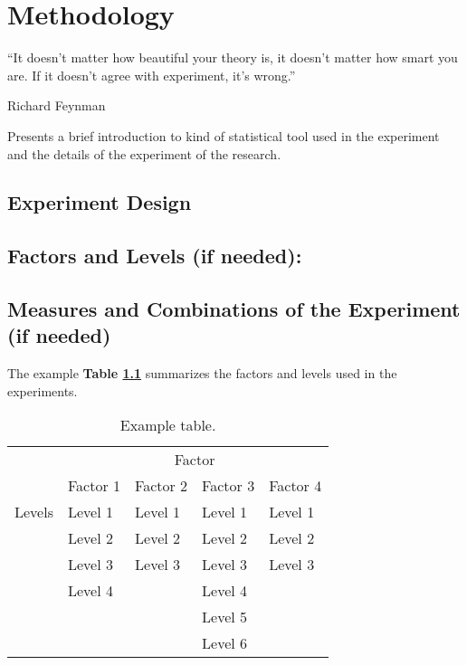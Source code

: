 


\chapter{Methodology}
\label{chapter:methodology}
\epigraph{``It doesn't matter how beautiful your theory is, it doesn't matter how smart you are. If it doesn't agree with experiment, it's wrong.''}{\vspace{10pt}Richard Feynman }

\newpage

Presents a brief introduction to kind of statistical tool used in the experiment and the details of the experiment of the research. 
\section{Experiment Design}
\label{section:experiment-design}

\section{Factors and Levels (if needed):}

\section{Measures and Combinations of the Experiment (if needed)}
The example \textbf{Table \ref{tab:table}} summarizes the factors and levels used in the experiments.
\begin{table}[h]
	\caption{Example table.}
	\label{tab:table}
	\begin{center}
		\begin{tabular}{|l|l|l|l|l|}
			\cline{2-5}
			\multicolumn{1}{c|}{}	& \multicolumn{4}{c|}{Factor} \\ 
			\cline{2-5}
			\multicolumn{1}{c|}{}	& Factor 1 & Factor 2 & Factor 3 & Factor 4 \\ \hline
			Levels
			& Level 1 & Level 1	& Level 1  & Level 1   \\
			& Level 2 & Level 2  & Level 2 & Level 2 \\
			& Level 3 & Level 3 & Level 3 & Level 3 \\
			& Level 4 &    & Level 4  &   \\ 
			&  &    & Level 5  &   \\ 
			&  &    & Level 6  &     \\\hline
		\end{tabular}
	\end{center}
\end{table}



